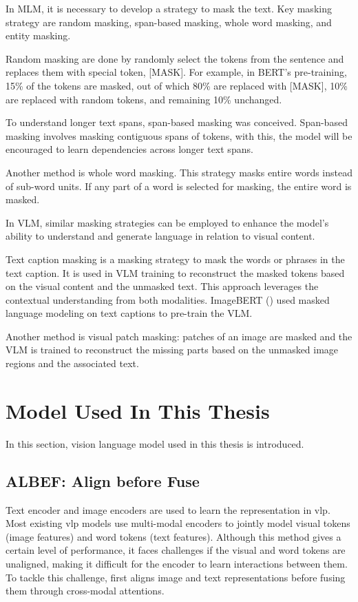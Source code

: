 In MLM, it is necessary to develop a strategy to mask the text. Key masking strategy are random masking, span-based masking, whole word masking, and entity masking. 

Random masking are done by randomly select the tokens from the sentence and replaces them with special token, [MASK]. For example, in BERT's pre-training, 15\% of the tokens are masked, out of which 80\% are replaced with [MASK], 10\% are replaced with random tokens, and remaining 10\% unchanged. 

To understand longer text spans, span-based masking was conceived. Span-based masking involves masking contiguous spans of tokens, with this, the model will be encouraged to learn dependencies across longer text spans. 

Another method is whole word masking. This strategy masks entire words instead of sub-word units. If any part of a word is selected for masking, the entire word is masked.

In VLM, similar masking strategies can be employed to enhance the model's ability to understand and generate language in relation to visual content.

Text caption masking is a masking strategy to mask the words or phrases in the text caption. It is used in VLM training to reconstruct the masked tokens based on the visual content and the unmasked text. This approach leverages the contextual understanding from both modalities. ImageBERT (\cite{qi2020imagebertcrossmodalpretraininglargescale}) used masked language modeling on text captions to pre-train the VLM.

Another method is visual patch masking: patches of an image are masked and the VLM is trained to reconstruct the missing parts based on the unmasked image regions and the associated text.

\section{Model Used In This Thesis}
In this section, vision language model used in this thesis is introduced.

\subsection{ALBEF: Align before Fuse}
Text encoder and image encoders are used to learn the representation in \acrfull{vlp}. Most existing \acrshort{vlp} models use multi-modal encoders to jointly model visual tokens (image features) and word tokens (text features). Although this method gives a certain level of performance, it faces challenges if the visual and word tokens are unaligned, making it difficult for the encoder to learn interactions between them. 
To tackle this challenge, \cite{li2021align} first aligns image and text representations before fusing them through cross-modal attentions. 


